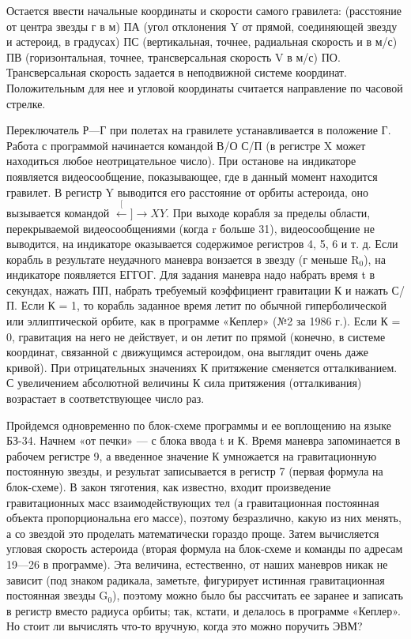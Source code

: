 \documentclass[11pt,a4paper,oneside]{article}
\def\XY{$\stackrel[\leftarrow]{\rightarrow}{XY}$}
\begin{document}
Остается ввести начальные координаты и скорости самого гравилета: (расстояние от центра звезды г в м) ПА (угол отклонения Y от прямой, соединяющей звезду и астероид, в градусах) ПС (вертикальная, точнее, радиальная скорость и в м/с) ПВ (горизонтальная, точнее, трансверсальная скорость V в м/с) ПО. Трансверсальная скорость задается в неподвижной системе координат. Положительным для нее и угловой координаты считается направление по часовой стрелке.

Переключатель Р—Г при полетах на гравилете устанавливается в положение Г. Работа с программой начинается командой В/О С/П (в регистре X может находиться любое неотрицательное число). При останове на индикаторе появляется видеосообщение, показывающее, где в данный момент находится гравилет. В регистр Y выводится его расстояние от орбиты астероида, оно вызывается командой \XY. При выходе корабля за пределы области, перекрываемой видеосообщениями (когда r больше 31), видеосообщение не выводится, на индикаторе оказывается содержимое регистров 4, 5, 6 и т. д. Если корабль в результате неудачного маневра вонзается в звезду (г меньше R$_{0}$), на индикаторе появляется ЕГГОГ. Для задания маневра надо набрать время t в секундах, нажать ПП, набрать требуемый коэффициент гравитации К и нажать С/П. Если К = 1, то корабль заданное время летит по обычной гиперболической или эллиптической орбите, как в программе «Кеплер» (№2 за 1986 г.). Если К = 0, гравитация на него не действует, и он летит по прямой (конечно, в системе координат, связанной с движущимся астероидом, она выглядит очень даже кривой). При отрицательных значениях К притяжение сменяется отталкиванием. С увеличением абсолютной величины К сила притяжения (отталкивания) возрастает в соответствующее число раз.

Пройдемся одновременно по блок-схеме программы и ее воплощению на языке БЗ-34. Начнем «от печки» — с блока ввода t и К. Время маневра запоминается в рабочем регистре 9, а введенное значение К умножается на гравитационную постоянную звезды, и результат записывается в регистр 7 (первая формула на блок-схеме). В закон тяготения, как известно, входит произведение гравитационных масс взаимодействующих тел (а гравитационная постоянная объекта пропорциональна его массе), поэтому безразлично, какую из них менять, а со звездой это проделать математически гораздо проще. Затем вычисляется угловая скорость астероида (вторая формула на блок-схеме и команды по адресам 19—26 в программе). Эта величина, естественно, от наших маневров никак не зависит (под знаком радикала, заметьте, фигурирует истинная гравитационная постоянная звезды G$_{0}$), поэтому можно было бы рассчитать ее заранее и записать в регистр вместо радиуса орбиты; так, кстати, и делалось в программе «Кеплер». Но стоит ли вычислять что-то вручную, когда это можно поручить ЭВМ?
\end{document}
